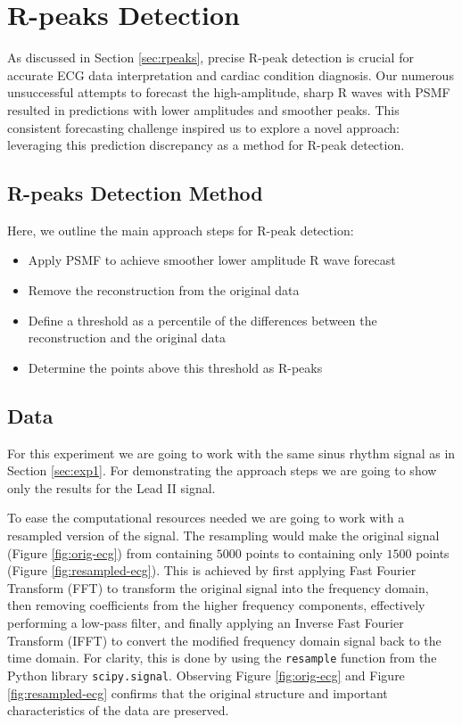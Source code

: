 \documentclass{mldsmsc}
\begin{document}
\section{R-peaks Detection}\label{sec:rpeaksdet}

As discussed in Section \ref{sec:rpeaks}, precise R-peak detection is crucial for accurate ECG data interpretation and cardiac condition diagnosis. Our numerous unsuccessful attempts to forecast the high-amplitude, sharp R waves with PSMF resulted in predictions with lower amplitudes and smoother peaks. This consistent forecasting challenge inspired us to explore a novel approach: leveraging this prediction discrepancy as a method for R-peak detection.

\subsection{R-peaks Detection Method}

\noindent Here, we outline the main approach steps for R-peak detection:
\begin{itemize}
    \item Apply PSMF to achieve smoother lower amplitude R wave forecast
    \item Remove the reconstruction from the original data
    \item Define a threshold as a percentile of the differences between the reconstruction and the original data
    \item Determine the points above this threshold as R-peaks
\end{itemize}

\subsection{Data}

\noindent For this experiment we are going to work with the same sinus rhythm signal as in Section \ref{sec:exp1}. For demonstrating the approach steps we are going to show only the results for the Lead II signal. \newline

\noindent To ease the computational resources needed we are going to work with a resampled version of the signal. The resampling would make the original signal (Figure \ref{fig:orig-ecg}) from containing $5000$ points to containing only $1500$ points (Figure \ref{fig:resampled-ecg}). This is achieved by first applying Fast Fourier Transform (FFT) to transform the original signal into the frequency domain, then removing coefficients from the higher frequency components, effectively performing a low-pass filter, and finally applying an Inverse Fast Fourier Transform (IFFT) to convert the modified frequency domain signal back to the time domain. For clarity, this is done by using the \texttt{resample} function from the Python library \texttt{scipy.signal}. Observing Figure \ref{fig:orig-ecg} and Figure \ref{fig:resampled-ecg} confirms that the original structure and important characteristics of the data are preserved. \newline
\end{document}
